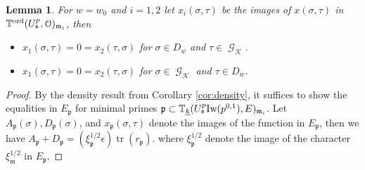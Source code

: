 \documentclass[leqno]{amsart}
\newtheorem{lem}[thm]{Lemma}
\theoremstyle{definition}
\theoremstyle{remark}
\newcommand{\eo}{\EuScript{O}}
\DeclareMathOperator{\mtr}{tr}
\DeclareMathOperator{\Gal}{\mathcal{G}}
\newcommand{\fm}{\mathfrak{m}}
\newcommand{\fp}{\mathfrak{p}}
\newcommand{\fs}{\mathfrak{s}}
\newcommand{\K}{{\mathcal{K}}} %
\newcommand{\bw}{{\overline{w}}}
\newcommand{\wt}[1]{\underline{ #1 }}
\newcommand{\Iw}{\textnormal{Iw}} %
\newcommand{\TT}{\mathbb{T}} %
\newcommand{\ord}{\textnormal{ord}} %
\begin{document}
\begin{lem}
For $w=w_0$ and $i=1,2$ let
$x_i(\sigma,\tau)$ be the images of $x(\sigma,\tau)$ in
$\TT^{\ord}(U^p_\fs,\eo)_{\fm_i}$, then 
\begin{itemize}
    \item $x_1(\sigma,\tau)=0=x_2(\tau, \sigma)$ 
    for $\sigma\in D_{w}$ and $\tau\in\Gal_\K$.
    \item $x_1(\sigma,\tau)=0=x_2(\tau,\sigma)$ 
    for $\sigma\in \Gal_\K$ and $\tau\in D_{\bw}$.
\end{itemize}
\end{lem}


\begin{proof}

By the density result from Corollary \ref{cor:density},
it suffices to show the equalities in $E_\fp$
for minimal primes
$\fp\subset \TT_{\wt{k}}(U^p_\fs\Iw(p^{0,1}),E)_{\fm_i}$.
Let $A_\fp(\sigma), D_\fp(\sigma)$, and $x_\fp(\sigma,\tau)$
denote the images of the function in $E_\fp$,
then we have $A_\fp+D_\fp=(\xi_\fp^{1/2}\epsilon)\mtr(r_\fp)$.
where $\xi_\fp^{1/2}$ denote the image 
of the character $\xi_\fm^{1/2}$ in $E_\fp$.


\end{proof}
\end{document}
